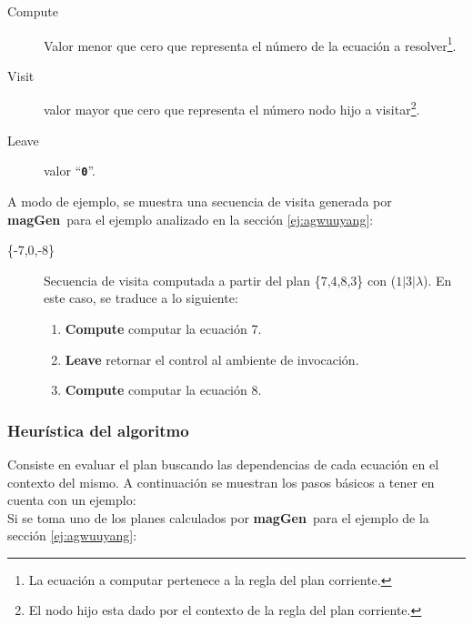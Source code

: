 \documentclass[runningheads,a4paper]{llncs}
\newcommand{\textbtt}[1]{\texttt{\textbf{#1}}}
\newcommand{\maggen}{\textbf{magGen}}
\begin{document}
\begin{description}
\item [Compute] Valor menor que cero que representa el número de la ecuación a resolver\footnote{La ecuación a computar pertenece a la regla del plan corriente.}.
\item [Visit] valor mayor que cero que representa el número nodo hijo a visitar\footnote{El nodo hijo esta dado por el contexto de la regla del plan corriente.}.
\item [Leave] valor ``\textbtt{0}''.
\end{description}

A modo de ejemplo, se muestra una secuencia de visita generada por \maggen\ para el ejemplo analizado en la sección \ref{ej:agwuuyang}:

\begin{description}
\item [\{-7,0,-8\}] Secuencia de visita computada a partir del plan \{7,4,8,3\} con  ($ 1 | 3 | \lambda$). En este caso, se traduce a lo siguiente:

\begin{enumerate}
\item \textbf{Compute} computar la ecuación 7.
\item \textbf{Leave} retornar el control al ambiente de invocación.
\item \textbf{Compute} computar la ecuación 8.
\end{enumerate}

\end{description}

\subsubsection{Heurística del algoritmo}
\label{subsec:heuris-simul}

Consiste en evaluar el plan buscando las dependencias de cada ecuación en el contexto del mismo. A continuación se muestran los pasos básicos a tener en cuenta con un ejemplo:\\

Si se toma uno de los planes calculados por \maggen\ para el ejemplo de la sección \ref{ej:agwuuyang}:\\
\end{document}
